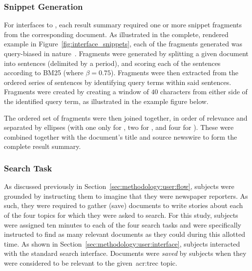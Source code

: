 \subsubsection{Snippet Generation}\label{sec:snippets:method:snippets}
For interfaces  to , each result summary required one or more snippet fragments from the corresponding document. As illustrated in the complete, rendered example in Figure~\ref{fig:interface_snippets}, each of the fragments generated was query-biased in nature~\citep{tombros1998query_biased}. Fragments were generated by splitting a given document into sentences (delimited by a period), and scoring each of the sentences according to BM25 (where $\beta=0.75$). Fragments were then extracted from the ordered series of sentences by identifying query terms within said sentences. Fragments were created by creating a window of $40$ characters from either side of the identified query term, as illustrated in the example figure below.

\begin{figure}[h]
    \centering
    \vspace{4mm}
    \label{fig:fragment_example}
    \vspace{-5mm}
\end{figure}

The ordered set of fragments were then joined together, in order of relevance and separated by ellipses (with one only for , two for , and four for ). These were combined together with the document's title and source newswire to form the complete result summary.

\subsubsection{Search Task}
As discussed previously in Section~\ref{sec:methodology:user:flow}, subjects were grounded by instructing them to imagine that they were newspaper reporters. As such, they were required to gather (save) documents to write stories about each of the four topics for which they were asked to search. For this study, subjects were assigned ten minutes to each of the four search tasks and were specifically instructed to find as many relevant documents as they could during this allotted time. As shown in Section~\ref{sec:methodology:user:interface}, subjects interacted with the standard search interface. Documents were \emph{saved} by subjects when they were considered to be relevant to the given~\gls{acr:trec} topic.

